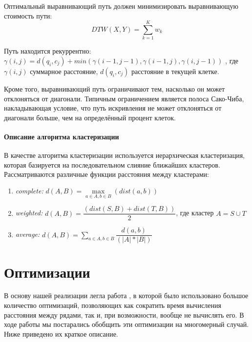 \documentclass[12pt,twoside]{article}
\begin{document}
        Оптимальный выравнивающий путь должен минимизировать выравнивающую стоимость пути:
            $$
                DTW(X, Y)=\displaystyle\sum\limits_{k=1}^{K} w_k
            $$
            
        Путь находится рекуррентно:\\
            $\gamma(i, j) = d(q_i, c_j) + min({\gamma(i-1, j-1), \gamma(i-1, j), \gamma(i, j-1)})$ ,
            где $\gamma(i, j)$ суммарное расстояние, $d(q_i, c_j)$ расстояние в текущей клетке.
						
                Кроме того, выравнивающий путь ограничивают тем, насколько он может отклоняться от диагонали.
                Типичным ограничением является полоса Сако-Чиба, накладывающая условие, что путь искривления не может отклоняться от диагонали больше,
                чем на определённый процент клеток.

	\paragraph{Описание алгоритма кластеризации}      
        В качестве алгоритма кластеризации используется иерархическая кластеризация, которая базируется на последовательном слияние ближайших кластеров.
        Рассматриваются различные функции расстояния между кластерами: 
        \begin{enumerate}
            \item \textit{complete:}  $d(A, B) = \max\limits_{a \in A, b \in B}(dist(a, b))$ 
            \item \textit{weighted:}  $d(A,B) = \dfrac{(dist(S,B) + dist(T,B))}{2}$, где кластер $A = S \cup T$
            \item \textit{average:}   $d(A,B) = \sum\limits_{a \in A, b \in B} \dfrac{d(a, b)}{(|A|*|B|)}$ 
        \end{enumerate} 
                
    \section{Оптимизации}
        В основу нашей реализации легла работа \cite{Rakthanmanon:2012:SMT:2339530.2339576}, в которой было
        использовано большое количество оптимизаций, позволяющих как сократить время вычисления расстояния 
        между рядами, так и, при возможности, вообще не вычислять его. 
        В ходе работы мы постарались обобщить эти оптимизации на многомерный случай.
        Ниже приведено их краткое описание. 
\end{document}
